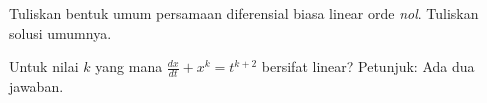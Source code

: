 \begin{exercise}
Tuliskan bentuk umum persamaan diferensial biasa linear orde \emph{nol}.
Tuliskan solusi umumnya.
\end{exercise}

\begin{exercise}
Untuk nilai $k$ yang mana $\frac{dx}{dt}+x^k = t^{k+2}$ bersifat linear?
Petunjuk: Ada dua jawaban.
\end{exercise}

